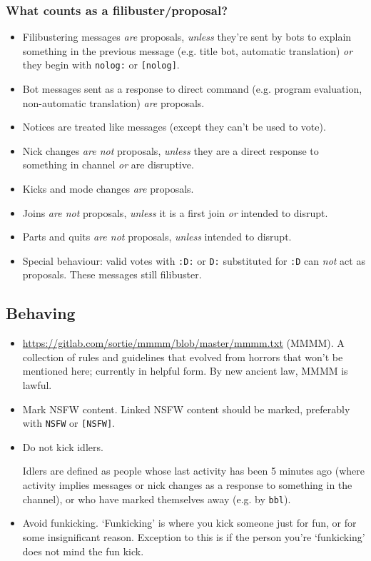 \documentclass[11pt]{article}
\begin{document}
\subsubsection{What counts as a filibuster/proposal?}

\begin{itemize}

\item Filibustering messages \emph{are} proposals, \emph{unless} they're sent by bots to explain something in the previous message (e.g. title bot, automatic translation) \emph{or} they begin with \texttt{nolog:} or \texttt{[nolog]}.
\item Bot messages sent as a response to direct command (e.g. program evaluation, non-automatic translation) \emph{are} proposals.
\item Notices are treated like messages (except they can't be used to vote).
\item Nick changes \emph{are not} proposals, \emph{unless} they are a direct response to something in channel \emph{or} are disruptive.
\item Kicks and mode changes \emph{are} proposals.
\item Joins \emph{are not} proposals, \emph{unless} it is a first join \emph{or} intended to disrupt.
\item Parts and quits \emph{are not} proposals, \emph{unless} intended to disrupt.
\item Special behaviour: valid votes with \texttt{:D:} or \texttt{D:} substituted for \texttt{:D} can \emph{not} act as proposals. These messages
still filibuster.
\end{itemize}

\subsection{Behaving}

\begin{itemize}

\item \url{https://gitlab.com/sortie/mmmm/blob/master/mmmm.txt} (MMMM).
A collection of rules and guidelines that evolved from horrors that won't be mentioned here; currently in helpful form. By new ancient law, MMMM is lawful.

\item Mark NSFW content. Linked NSFW content should be marked, preferably with \texttt{NSFW} or \texttt{[NSFW]}.

\item Do not kick idlers.

Idlers are defined as people whose last activity has been 5 minutes ago (where activity implies messages or nick changes as a response to something in the channel), or who have marked themselves away (e.g. by \texttt{bbl}).

\item Avoid funkicking.
`Funkicking' is where you kick someone just for fun, or for some insignificant reason. Exception to this is if the person you're `funkicking' does not mind the fun kick.

\end{itemize}
\end{document}
